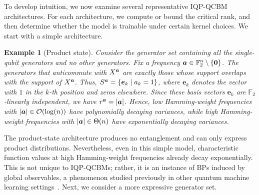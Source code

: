 \documentclass{article}
\theoremstyle{plain}
\newtheorem{example}[theorem]{Example}
\theoremstyle{definition}
\theoremstyle{remark}
\begin{document}
To develop intuition, we now examine several representative IQP-QCBM architectures. For each architecture, we compute or bound the critical rank, and then determine whether the model is trainable under certain kernel choices. We start with a simple architecture.

\begin{example}[Product state]
\label{eg:product}
Consider the generator set containing all the single-qubit generators and no other generators. Fix a frequency ${\bm{a}} \in \mathbb{F}_2^n \setminus \{\bm{0}\}$. The generators that anticommute with $X^{\bm{a}}$ are exactly those whose support overlaps with the support of $X^{\bm{a}}$. Thus, $S^{\bm{a}}=\{\bm{e}_k \mid a_k=1\}$, where $\bm{e}_k$ denotes the vector with $1$ in the $k$-th position and zeros elsewhere. Since these basis vectors $\bm{e}_k$ are $\mathbb{F}_2$-linearly independent, we have $r^{\bm{a}} = \abs{{\bm{a}}}$. Hence, low Hamming-weight frequencies with $\abs{{\bm{a}}} \in \mathcal{O}(\log(n))$ have polynomially decaying variances, while high Hamming-weight frequencies with $\abs{{\bm{a}}} \in \Theta(n)$ have exponentially decaying variances.
\end{example}

The product-state architecture produces no entanglement and can only express product distributions. Nevertheless, even in this simple model, characteristic function values at high Hamming-weight frequencies already decay exponentially. This is not unique to IQP-QCBMs; rather, it is an instance of BPs induced by global observables, a phenomenon studied previously in other quantum machine learning settings~\citet{Cerezo21,rudolph24}. Next, we consider a more expressive generator set.
\end{document}
